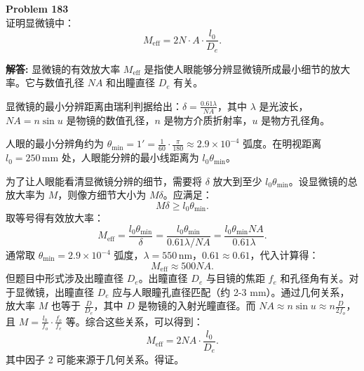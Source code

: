 \documentclass[12pt, a4paper, oneside]{ctexart}
\newenvironment{solution}{\par\noindent\textbf{解答:}\quad}{\par}
\begin{document}
\begin{mdframed}[backgroundcolor=gray!10, linewidth=0pt]
    \textbf{Problem 183} \\
    证明显微镜中：
    \[
    M_{\text{eff}} = 2 N \cdot A \cdot \frac{l_0}{D_e}.
    \]
\end{mdframed}
\begin{solution}
    显微镜的有效放大率 $M_{\text{eff}}$ 是指使人眼能够分辨显微镜所成最小细节的放大率。它与数值孔径 $N\!A$ 和出瞳直径 $D_e$ 有关。

    显微镜的最小分辨距离由瑞利判据给出：$\delta = \frac{0.61 \lambda}{N\!A}$，其中 $\lambda$ 是光波长，$N\!A = n \sin u$ 是物镜的数值孔径，$n$ 是物方介质折射率，$u$ 是物方孔径角。

    人眼的最小分辨角约为 $\theta_{\min} = 1' = \frac{1}{60} \cdot \frac{\pi}{180} \approx 2.9 \times 10^{-4}$ 弧度。在明视距离 $l_0 = 250 \, \text{mm}$ 处，人眼能分辨的最小线距离为 $l_0 \theta_{\min}$。

    为了让人眼能看清显微镜分辨的细节，需要将 $\delta$ 放大到至少 $l_0 \theta_{\min}$。设显微镜的总放大率为 $M$，则像方细节大小为 $M \delta$。应满足：
    \[
    M \delta \ge l_0 \theta_{\min}.
    \]
    取等号得有效放大率：
    \[
    M_{\text{eff}} = \frac{l_0 \theta_{\min}}{\delta} = \frac{l_0 \theta_{\min}}{0.61 \lambda / N\!A} = \frac{l_0 \theta_{\min} N\!A}{0.61 \lambda}.
    \]
    通常取 $\theta_{\min} = 2.9 \times 10^{-4}$ 弧度，$\lambda = 550 \, \text{nm}$，$0.61 \approx 0.61$，代入计算得：
    \[
    M_{\text{eff}} \approx 500 N\!A.
    \]
    但题目中形式涉及出瞳直径 $D_e$。出瞳直径 $D_e$ 与目镜的焦距 $f_e$ 和孔径角有关。对于显微镜，出瞳直径 $D_e$ 应与人眼瞳孔直径匹配（约 2-3 mm）。通过几何关系，放大率 $M$ 也等于 $\frac{D}{D_e}$，其中 $D$ 是物镜的入射光瞳直径。而 $N\!A \approx n \sin u \approx n \frac{D}{2f_o}$，且 $M = \frac{l_0}{f_o} \cdot \frac{f_o}{f_e}$ 等。综合这些关系，可以得到：
    \[
    M_{\text{eff}} = 2 N\!A \cdot \frac{l_0}{D_e}.
    \]
    其中因子 2 可能来源于几何关系。得证。
\end{solution}
\end{document}
